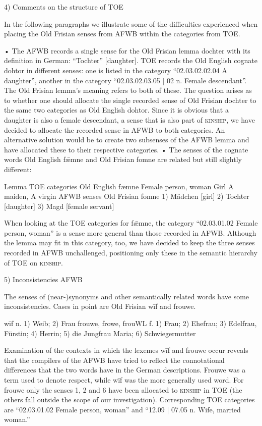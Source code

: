 4) Comments on the structure of TOE 

In the following paragraphs we illustrate some of the difficulties experienced when placing the Old Frisian senses from AFWB within the categories from TOE.

•	The AFWB records a single sense for the Old Frisian lemma dochter with its definition in German: “Tochter” [daughter]. TOE records the Old English cognate dohtor in different senses: one is listed in the category “02.03.02.02.04 A daughter”, another in the category “02.03.02.03.05 | 02 n. Female descendant”.  The Old Frisian lemma's meaning refers to both of these. The question arises as to whether one should allocate the single recorded sense of Old Frisian dochter to the same two categories as Old English dohtor. Since it is obvious that a daughter is also a female descendant, a sense that is also part of \textsc{kinship}, we have decided to allocate the recorded sense in AFWB to both categories. An alternative solution would be to create two subsenses of the AFWB lemma and have allocated these to their respective categories.
•	The senses of the cognate words Old English fǣmne and Old Frisian fomne are related but still slightly different:

Lemma 	TOE categories
Old English fǣmne	Female person, woman	Girl	A maiden, A virgin
	AFWB senses
Old Frisian fomne	1) Mädchen [girl]	2) Tochter [daughter]	3) Magd [female servant]

When looking at the TOE categories for fǣmne, the category “02.03.01.02 Female person, woman” is a sense more general than those recorded in AFWB.  Although the lemma may fit in this category, too, we have decided to keep the three senses recorded in AFWB unchallenged, positioning only these in the semantic hierarchy of TOE on \textsc{kinship}.

5) Inconsistencies AFWB

The senses of (near-)synonyms and other semantically related words have some inconsistencies. Cases in point are Old Frisian wīf and frouwe.

	wīf n. 1) Weib; 2) Frau 
	frouwe, frowe, frouWL f. 1) Frau; 2) Ehefrau; 3) Edelfrau, Fürstin; 4) Herrin; 5) die Jungfrau 
	Maria; 6) Schwiegermutter 

Examination of the contexts in which the lexemes wīf and frouwe occur reveals that the compilers of the AFWB have tried to reflect the connotational differences that the two words have in the German descriptions. Frouwe was a term used to denote respect, while wīf was the more generally used word. For frouwe only the senses 1, 2 and 6 have been allocated to \textsc{kinship} in TOE (the others fall outside the scope of our investigation). Corresponding TOE categories are “02.03.01.02 Female person, woman” and “12.09 | 07.05 n. Wife, married woman.” 

